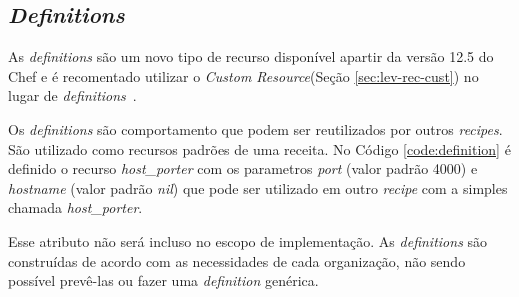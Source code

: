 
\subsection{\textit{Definitions}}
\label{sec:lev-rec-def}

As \textit{definitions} são um novo tipo de recurso disponível apartir da versão
12.5 do Chef e é recomentado utilizar o \textit{Custom Resource}(Seção \ref{sec:lev-rec-cust})
no lugar de \textit{definitions}~\cite{chefdoc:2016}.

Os \textit{definitions} são comportamento que podem ser reutilizados por outros \textit{recipes}.
São utilizado como recursos padrões de uma receita. No Código \ref{code:definition}
é definido o recurso \textit{host\_porter} com os parametros \textit{port} (valor padrão 4000)
e \textit{hostname} (valor padrão \textit{nil}) que pode ser utilizado em outro
\textit{recipe} com a simples chamada \textit{host\_porter}.

\begin{minipage}{.90\textwidth}
  \lstset{style=shell}
  
\end{minipage}

Esse atributo não será incluso no escopo de implementação. As \textit{definitions} são
construídas de acordo com as necessidades de cada organização, não sendo
possível prevê-las ou fazer uma \textit{definition} genérica.

